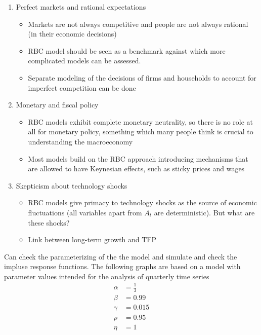 \documentclass{beamer}
\begin{document}
\begin{frame}
\begin{enumerate}
  \item Perfect markets and rational expectations
  \begin{itemize}
    \item Markets are not always competitive and people are not always rational (in their economic decisions)
    \item RBC model should be seen as a benchmark against which more complicated models can be assessed. 
    \item Separate modeling of the decisions of firms and households to account for imperfect competition can be done    
  \end{itemize}

  \item Monetary and fiscal policy
  \begin{itemize}
    \item RBC models exhibit complete monetary neutrality, so there is no role at all for monetary policy, something which many people think is crucial to understanding the macroeconomy
    \item Most models build on the RBC approach introducing mechanisms that are allowed to have Keynesian effects, such as sticky prices and
    wages 
  \end{itemize}
  \item Skepticism about technology shocks
  \begin{itemize}
    \item RBC models give primacy to technology shocks as the source of economic fluctuations (all variables apart from $A_t$ are
    deterministic). But what are these shocks?
    \item Link between long-term growth and TFP
  \end{itemize}
\end{enumerate}

\end{frame}

\begin{frame}
  Can check the parameterizing of the the model and simulate and check the impluse response functions. 
The following graphs are based on a model with parameter values intended for the analysis of quarterly time series
\begin{align}
  \alpha &=\frac{1}{3}\\
  \beta &=0.99\\
  \gamma &=0.015\\
  \rho &= 0.95\\
  \eta &= 1
\end{align}
\end{frame}
\end{document}

